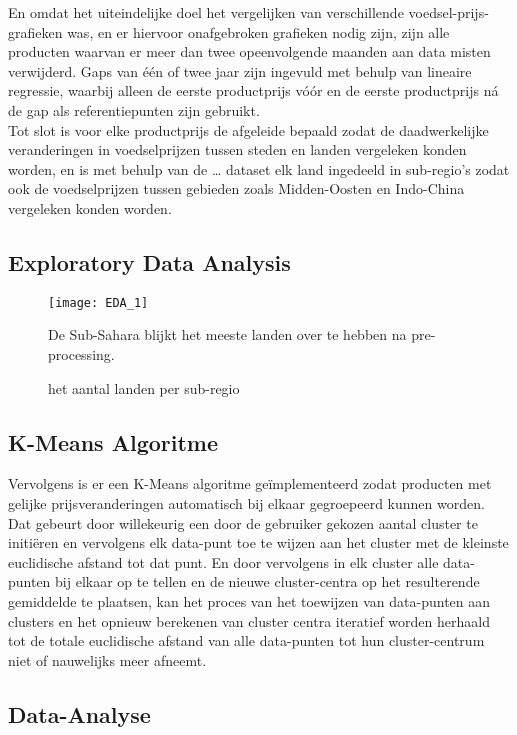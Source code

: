 \documentclass{article}
\begin{document}
En omdat het uiteindelijke doel het vergelijken van verschillende voedsel-prijs-grafieken was, en er hiervoor onafgebroken grafieken nodig zijn, zijn alle producten waarvan er meer dan twee opeenvolgende maanden aan data misten verwijderd. Gaps van één of twee jaar zijn ingevuld met behulp van lineaire regressie, waarbij alleen de eerste productprijs vóór en de eerste productprijs ná de gap als referentiepunten zijn gebruikt. \\

Tot slot is voor elke productprijs de afgeleide bepaald zodat de daadwerkelijke veranderingen in voedselprijzen tussen steden en landen vergeleken konden worden, en is met behulp van de … dataset elk land ingedeeld in sub-regio’s zodat ook de voedselprijzen tussen gebieden zoals Midden-Oosten en Indo-China vergeleken konden worden.\\

\subsection*{Exploratory Data Analysis}

\begin{figure}[h]
\centering
\texttt{[image: EDA\_1]}
\caption{het aantal landen per sub-regio }
\medskip
\small
De Sub-Sahara blijkt het meeste landen over te hebben na pre-processing.  
\end{figure}




\subsection*{K-Means Algoritme}
Vervolgens is er een K-Means algoritme geïmplementeerd zodat producten met gelijke prijsveranderingen automatisch bij elkaar gegroepeerd kunnen worden. Dat gebeurt door willekeurig een door de gebruiker gekozen aantal cluster te initiëren en vervolgens elk data-punt toe te wijzen aan het cluster met de kleinste euclidische afstand tot dat punt. 
En door vervolgens in elk cluster alle data-punten bij elkaar op te tellen en de nieuwe cluster-centra op het resulterende gemiddelde te plaatsen, kan het proces van het toewijzen van data-punten aan clusters en het opnieuw berekenen van cluster centra 
iteratief worden herhaald tot de totale euclidische afstand van alle data-punten tot hun cluster-centrum niet of nauwelijks meer afneemt. 

\subsection*{Data-Analyse}
\end{document}

